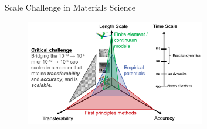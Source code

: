 \documentclass[aspectratio=169]{beamer}
\begin{document}
    \begin{frame}{Scale Challenge in Materials Science}
        \begin{figure}
            \centering
            \includegraphics[width=0.7\textwidth]{figures/scale_challenge.png}
        \end{figure}
    \end{frame}
\end{document}
